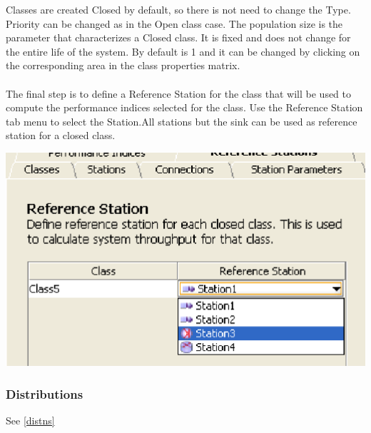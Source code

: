 Classes are created Closed by default, so there is not need to change the Type. Priority can be changed as in the Open class case. The population size is the parameter that characterizes a Closed class. It is fixed and does not change for the entire life of the system. By default is 1 and it can be changed by clicking on the corresponding area in the class properties matrix.\\\\
The final step is to define a Reference Station for the class that will be used to compute the performance indices selected for the class. Use the Reference Station tab menu to select the Station.All stations but the sink can be used as reference station for a closed class.\\
\begin{center}
\includegraphics[scale=.5]{img/jsim/reference_closed1.eps}
\end{center}

\subsubsection{Distributions}
\label{sec:Distributions}

See \autoref{distns}


